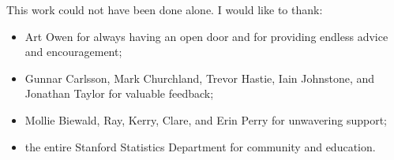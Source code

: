 
This work could not have been done alone.  I would like to thank:
\begin{itemize}
    \item Art Owen for always having an open door and for providing
        endless advice and encouragement;
    \item Gunnar Carlsson, Mark Churchland, Trevor Hastie, Iain Johnstone, 
        and Jonathan Taylor for valuable feedback;
    \item Mollie Biewald, Ray, Kerry, Clare, and Erin Perry for
        unwavering support;
    \item the entire Stanford Statistics Department for community and
        education.
\end{itemize}
